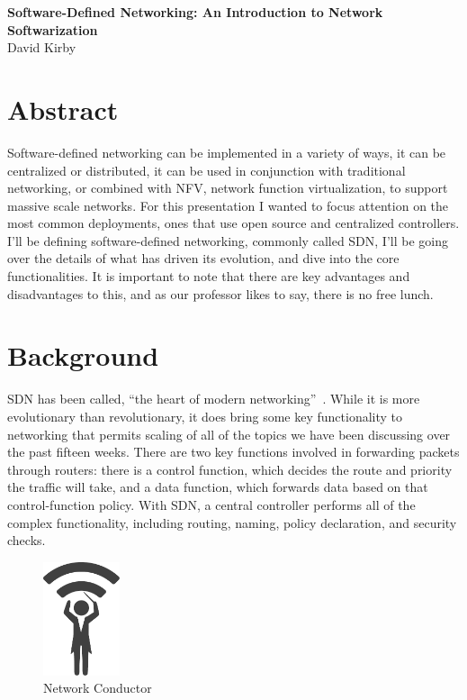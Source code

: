 \documentclass[11pt]{article}
\begin{document}
 	\begin{center}
	\Large{\bfseries Software-Defined Networking: An Introduction to Network Softwarization}\\[1em]
	\large{David Kirby}\\
	\end{center}

\section{Abstract}

Software-defined networking can be implemented in a variety of ways, it can be centralized or distributed, it can be used in conjunction with traditional networking, or combined with NFV, network function virtualization, to support massive scale networks. For this presentation I wanted to focus attention on the most common deployments, ones that use open source and centralized controllers. I’ll be defining software-defined networking, commonly called SDN, I’ll be going over the details of what has driven its evolution, and dive into the core functionalities. It is important to note that there are key advantages and disadvantages to this, and as our professor likes to say, there is no free lunch.

\section{Background}

SDN has been called, “the heart of modern networking”~\cite{Stallings}. While it is more evolutionary than revolutionary, it does bring some key functionality to networking that permits scaling of all of the topics we have been discussing over the past fifteen weeks. There are two key functions involved in forwarding packets through routers: there is a control function, which decides the route and priority the traffic will take, and a data function, which forwards data based on that control-function policy. With SDN, a central controller performs all of the complex functionality, including routing, naming, policy declaration, and security checks.\par

\begin{figure}
	\includegraphics[width=0.2\textwidth]{NetworkConductor}
	\caption{Network Conductor}
\end{figure}
\end{document}
